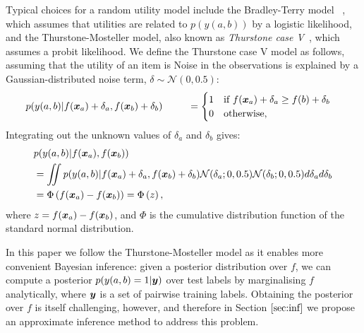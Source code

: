 Typical choices for a random utility model include
the Bradley-Terry model ~\citep{bradley1952rank,plackett1975analysis,luce1959possible},
which assumes that utilities are related to $p(y(a,b))$ by a logistic likelihood,
and the Thurstone-Mosteller model, also known as \emph{Thurstone case V}~\citep{thurstone1927law,mosteller2006remarks}, which assumes a probit likelihood.
We define the Thurstone case V model as follows,
assuming that the utility of an item is
Noise in the observations is explained by a Gaussian-distributed noise term, $\delta \sim \mathcal{N}(0, 0.5)$:
\begin{align}
 p(y(a, b) | f(\boldsymbol x_a) + \delta_{a}, f(\boldsymbol x_b) + \delta_{b} )  
 \hspace{0.9cm} & = \begin{cases}
 1 & \text{if }f(\boldsymbol x_a) + \delta_{a} \geq f(b) + \delta_{b} \\
 0 & \text{otherwise,}
 \end{cases} &
 \label{eq:thurstone}
\end{align}
Integrating out the unknown values of $\delta_a$ and $\delta_b$ gives:
\begin{align}
& p( y(a, b) | f(\boldsymbol x_a), f(\boldsymbol x_b) )  \nonumber\\
& = \int\!\!\!\! \int p( y(a, b) | f(\boldsymbol x_a) + \delta_{a}, f(\boldsymbol x_b) + \delta_{b} ) \mathcal{N}(\delta_{a}; 0, 0.5)\mathcal{N}(\delta_{b}; 0, 0.5) d\delta_{a} d\delta_{b} \nonumber\\
& = \Phi\left(f(\boldsymbol x_a) - f(\boldsymbol x_b)\right) = \Phi\left( z \right), 
\label{eq:plphi}
\end{align}
where $z = f(\boldsymbol x_a) - f(\boldsymbol x_b)$,
and $\Phi$ is the cumulative distribution function of the standard normal distribution. 

In this paper we follow the Thurstone-Mosteller model as it enables 
more convenient Bayesian inference: 
given a posterior distribution over $f$,
we can compute a posterior $p(y(a,b)=1 | \boldsymbol y)$ over test labels
by marginalising $f$ analytically, 
where $\boldsymbol y$ is a set of pairwise training labels.
Obtaining the posterior over $f$ is itself challenging, however, 
and therefore in Section $\ref{sec:inf}$ we propose 
an approximate inference method to address this problem.


